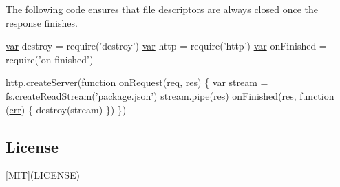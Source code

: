 The following code ensures that file descriptors are always closed once the response finishes.


\begin{DoxyCode}
\hyperlink{018__def_8c_a335628f2e9085305224b4f9cc6e95ed5}{var} destroy = require(\textcolor{stringliteral}{'destroy'})
\hyperlink{018__def_8c_a335628f2e9085305224b4f9cc6e95ed5}{var} http = require('http')
\hyperlink{018__def_8c_a335628f2e9085305224b4f9cc6e95ed5}{var} onFinished = require('on-finished')

http.createServer(\hyperlink{class_test_a51a683fa4fcec142ab1574e00a7b6860}{function} onRequest(req, res) \{
  \hyperlink{018__def_8c_a335628f2e9085305224b4f9cc6e95ed5}{var} stream = fs.createReadStream(\textcolor{stringliteral}{'package.json'})
  stream.pipe(res)
  onFinished(res, \textcolor{keyword}{function} (\hyperlink{message_8cpp_aede5746344fdce99647541101eaa7f06}{err}) \{
    destroy(stream)
  \})
\})
\end{DoxyCode}


\subsection*{License}

\mbox{[}M\+I\+T\mbox{]}(L\+I\+C\+E\+N\+S\+E) 